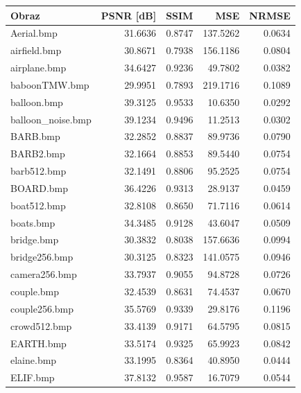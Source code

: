\documentclass{article}
\begin{document}
\begin{table}[h]
\centering
\begin{tabular}{@{}lrrrr@{}}
\toprule
Obraz              & PSNR {[}dB{]} & SSIM   & MSE      & NRMSE  \\ \midrule
Aerial.bmp         & 31.6636       & 0.8747 & 137.5262 & 0.0634 \\
airfield.bmp       & 30.8671       & 0.7938 & 156.1186 & 0.0804 \\
airplane.bmp       & 34.6427       & 0.9236 & 49.7802  & 0.0382 \\
baboonTMW.bmp      & 29.9951       & 0.7893 & 219.1716 & 0.1089 \\
balloon.bmp        & 39.3125       & 0.9533 & 10.6350  & 0.0292 \\
balloon\_noise.bmp & 39.1234       & 0.9496 & 11.2513  & 0.0302 \\
BARB.bmp           & 32.2852       & 0.8837 & 89.9736  & 0.0790 \\
BARB2.bmp          & 32.1664       & 0.8853 & 89.5440  & 0.0754 \\
barb512.bmp        & 32.1491       & 0.8806 & 95.2525  & 0.0754 \\
BOARD.bmp          & 36.4226       & 0.9313 & 28.9137  & 0.0459 \\
boat512.bmp        & 32.8108       & 0.8650 & 71.7116  & 0.0614 \\
boats.bmp          & 34.3485       & 0.9128 & 43.6047  & 0.0509 \\
bridge.bmp         & 30.3832       & 0.8038 & 157.6636 & 0.0994 \\
bridge256.bmp      & 30.3125       & 0.8323 & 141.0575 & 0.0946 \\
camera256.bmp      & 33.7937       & 0.9055 & 94.8728  & 0.0726 \\
couple.bmp         & 32.4539       & 0.8631 & 74.4537  & 0.0670 \\
couple256.bmp      & 35.5769       & 0.9339 & 29.8176  & 0.1196 \\
crowd512.bmp       & 33.4139       & 0.9171 & 64.5795  & 0.0815 \\
EARTH.bmp          & 33.5174       & 0.9325 & 65.9923  & 0.0842 \\
elaine.bmp         & 33.1995       & 0.8364 & 40.8950  & 0.0444 \\
ELIF.bmp           & 37.8132       & 0.9587 & 16.7079  & 0.0544 \\

\end{tabular}
\end{table}
\end{document}
